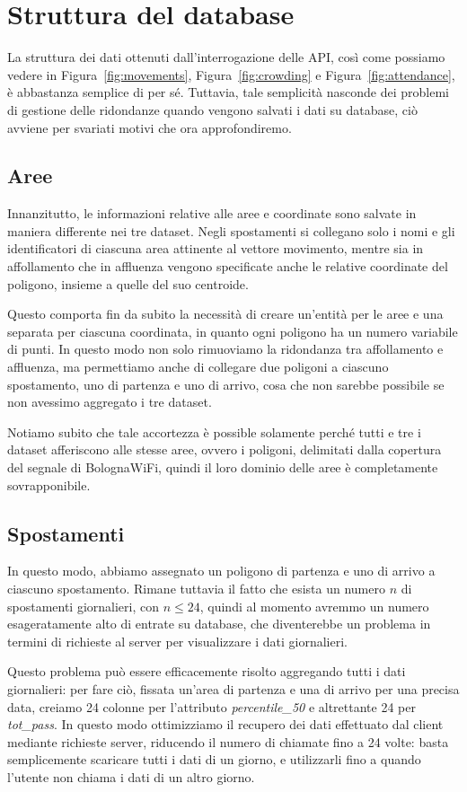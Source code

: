 \section{Struttura del database}
La struttura dei dati ottenuti dall'interrogazione delle API, così come possiamo vedere in Figura~\ref{fig:movements}, Figura~\ref{fig:crowding} e Figura~\ref{fig:attendance}, è abbastanza semplice di per sé. Tuttavia, tale semplicità nasconde dei problemi di gestione delle ridondanze quando vengono salvati i dati su database, ciò avviene per svariati motivi che ora approfondiremo.

\subsection{Aree}
Innanzitutto, le informazioni relative alle aree e coordinate sono salvate in maniera differente nei tre dataset. Negli spostamenti si collegano solo i nomi e gli identificatori di ciascuna area attinente al vettore movimento, mentre sia in affollamento che in affluenza vengono specificate anche le relative coordinate del poligono, insieme a quelle del suo centroide.

Questo comporta fin da subito la necessità di creare un'entità per le aree e una separata per ciascuna coordinata, in quanto ogni poligono ha un numero variabile di punti. In questo modo non solo rimuoviamo la ridondanza tra affollamento e affluenza, ma permettiamo anche di collegare due poligoni a ciascuno spostamento, uno di partenza e uno di arrivo, cosa che non sarebbe possibile se non avessimo aggregato i tre dataset.

Notiamo subito che tale accortezza è possible solamente perché tutti e tre i dataset afferiscono alle stesse aree, ovvero i poligoni, delimitati dalla copertura del segnale di BolognaWiFi, quindi il loro dominio delle aree è completamente sovrapponibile.

\subsection{Spostamenti}
In questo modo, abbiamo assegnato un poligono di partenza e uno di arrivo a ciascuno spostamento. Rimane tuttavia il fatto che esista un numero \( n \) di spostamenti giornalieri, con \( n \leq 24 \), quindi al momento avremmo un numero esageratamente alto di entrate su database, che diventerebbe un problema in termini di richieste al server per visualizzare i dati giornalieri.

Questo problema può essere efficacemente risolto aggregando tutti i dati giornalieri: per fare ciò, fissata un'area di partenza e una di arrivo per una precisa data, creiamo 24 colonne per l'attributo \textit{percentile\_50} e altrettante 24 per \textit{tot\_pass}. In questo modo ottimizziamo il recupero dei dati effettuato dal client mediante richieste server, riducendo il numero di chiamate fino a 24 volte: basta semplicemente scaricare tutti i dati di un giorno, e utilizzarli fino a quando l'utente non chiama i dati di un altro giorno.

